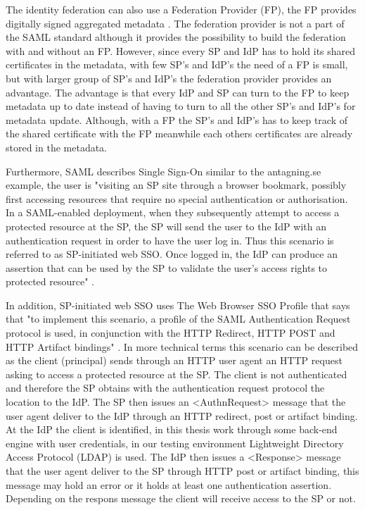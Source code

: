 The identity federation can also use a Federation Provider (FP), the FP provides digitally signed aggregated metadata 
\cite[p.~3]{pdf:Skolfederation}. The federation provider is not a part of the SAML standard although it provides the 
possibility to build the federation with and without an FP. However, since every SP and IdP has to hold its shared 
certificates in the metadata, with few SP's and IdP's the need of a FP is small, 
but with larger group of SP's and IdP's the federation provider provides an advantage. 
The advantage is that every IdP and SP can turn to the FP to keep metadata up to date instead of having to turn to all 
the other SP's and IdP's for metadata update. Although, with a FP the SP's and IdP's has to keep track of the shared 
certificate with the FP meanwhile each others certificates are already stored in the metadata.

Furthermore, SAML describes Single Sign-On similar to the antagning.se example, the user is "visiting an SP site through 
a browser bookmark, possibly first accessing resources that require no special authentication or authorisation. 
In a SAML-enabled deployment, when they subsequently attempt to access a protected resource at the SP, the SP will send 
the user to the IdP with an authentication request in order to have the user log in. 
Thus this scenario is referred to as SP-initiated web SSO. Once logged in, the IdP can produce an assertion that 
can be used by the SP to validate the user's access rights to protected resource" \cite[p.~12]{pdf:oasis-open}. 

In addition, SP-initiated web SSO uses The Web Browser SSO Profile that says that "to implement this scenario, 
a profile of the SAML Authentication Request protocol is used, in conjunction with the HTTP Redirect, HTTP POST and 
HTTP Artifact bindings" \cite[p.~14]{pdf:oasis-open-profiles}. 
In more technical terms this scenario can be described as the client (principal) sends through an HTTP user agent 
an HTTP request asking to access a protected resource at the SP. The client is not authenticated and therefore the SP 
obtains with the authentication request protocol the location to the IdP. The SP then issues an <AuthnRequest> message 
that the user agent deliver to the IdP through an HTTP redirect, post or artifact binding. 
At the IdP the client is identified, in this thesis work through some back-end engine with user credentials, in 
our testing environment Lightweight Directory Access Protocol (LDAP) is used. 
The IdP then issues a <Response> message that the user agent deliver to the SP through HTTP post or artifact binding, 
this message may hold an error or it holds at least one authentication assertion. Depending on the respons message the client will 
receive access to the SP or not. \cite[p.~15]{pdf:oasis-open-profiles}

